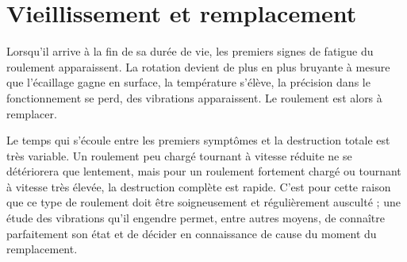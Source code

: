\section{	Vieillissement et remplacement}


Lorsqu’il arrive à la fin de sa durée de vie, les premiers signes de fatigue du roulement apparaissent. La rotation devient de plus en plus bruyante à mesure que l’écaillage gagne en surface, la température s’élève, la précision dans le fonctionnement se perd, des vibrations apparaissent. Le roulement est alors à remplacer.
\vspace{0.3cm}

Le temps qui s’écoule entre les premiers symptômes et la destruction totale est très variable. Un roulement peu chargé tournant à vitesse réduite ne se détériorera que lentement, mais pour un roulement fortement chargé ou tournant à vitesse très élevée, la destruction complète est rapide. C’est pour cette raison que ce type de roulement doit être soigneusement et régulièrement ausculté ; une étude des vibrations qu’il engendre permet, entre autres moyens, de connaître parfaitement son état et de décider en connaissance de cause du moment du remplacement.
